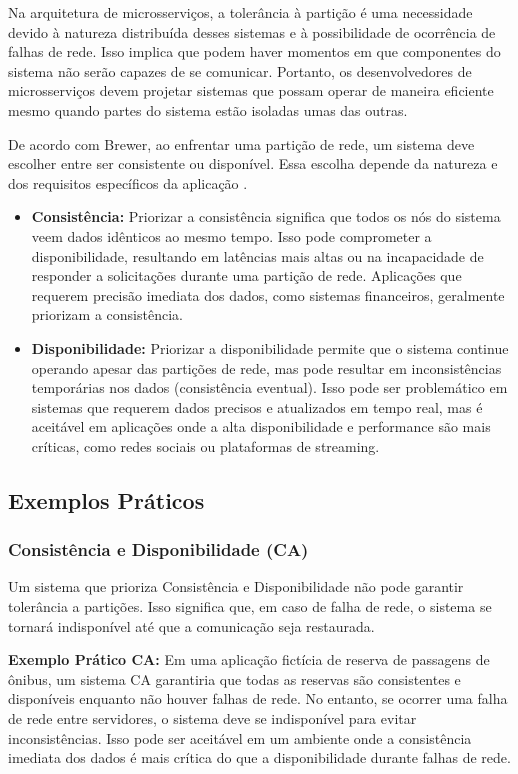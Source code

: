 Na arquitetura de microsserviços, a tolerância à partição é uma necessidade devido à natureza distribuída desses sistemas e à possibilidade de ocorrência de falhas de rede. Isso implica que podem haver momentos em que componentes do sistema não serão capazes de se comunicar. Portanto, os desenvolvedores de microsserviços devem projetar sistemas que possam operar de maneira eficiente mesmo quando partes do sistema estão isoladas umas das outras.

De acordo com Brewer, ao enfrentar uma partição de rede, um sistema deve escolher entre ser consistente ou disponível. Essa escolha depende da natureza e dos requisitos específicos da aplicação \cite{brewer2000}.

\begin{itemize}
    \item \textbf{Consistência:} Priorizar a consistência significa que todos os nós do sistema veem dados idênticos ao mesmo tempo. Isso pode comprometer a disponibilidade, resultando em latências mais altas ou na incapacidade de responder a solicitações durante uma partição de rede. Aplicações que requerem precisão imediata dos dados, como sistemas financeiros, geralmente priorizam a consistência.
    \item \textbf{Disponibilidade:} Priorizar a disponibilidade permite que o sistema continue operando apesar das partições de rede, mas pode resultar em inconsistências temporárias nos dados (consistência eventual). Isso pode ser problemático em sistemas que requerem dados precisos e atualizados em tempo real, mas é aceitável em aplicações onde a alta disponibilidade e performance são mais críticas, como redes sociais ou plataformas de streaming.
\end{itemize}

\subsection{Exemplos Práticos}

\subsubsection{Consistência e Disponibilidade (CA)}

Um sistema que prioriza Consistência e Disponibilidade não pode garantir tolerância a partições. Isso significa que, em caso de falha de rede, o sistema se tornará indisponível até que a comunicação seja restaurada.

\textbf{Exemplo Prático CA:} Em uma aplicação fictícia de reserva de passagens de ônibus, um sistema CA garantiria que todas as reservas são consistentes e disponíveis enquanto não houver falhas de rede. No entanto, se ocorrer uma falha de rede entre servidores, o sistema deve se indisponível para evitar inconsistências. Isso pode ser aceitável em um ambiente onde a consistência imediata dos dados é mais crítica do que a disponibilidade durante falhas de rede.

